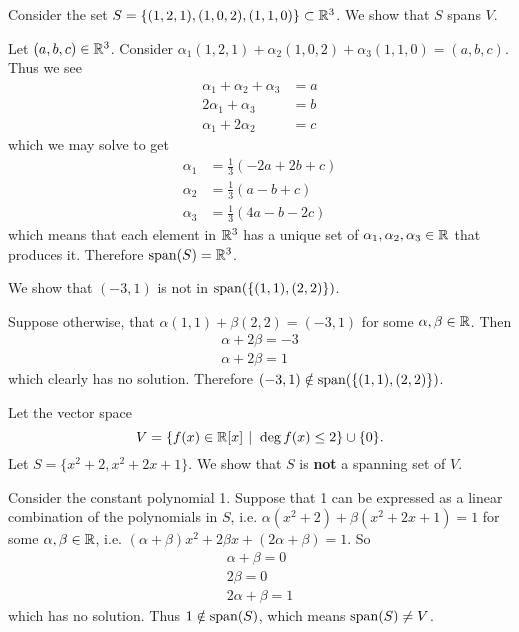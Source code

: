 \begin{example}
    Consider the set $S = \{(1, 2, 1), (1, 0, 2), (1, 1, 0)\} \subset \mathbb{R}^3$. We show that $S$ spans $V$.

    Let $(a, b, c) \in \mathbb{R}^3$. Consider $\alpha_1(1, 2, 1) + \alpha_2(1, 0, 2) + \alpha_3(1, 1, 0) = (a, b, c)$. Thus we see
    \begin{align*}
        \alpha_1 + \alpha_2 + \alpha_3 &= a\\
        2\alpha_1 + \alpha_3 &= b\\
        \alpha_1 + 2\alpha_2 &= c
    \end{align*}
    which we may solve to get
    \begin{align*}
        \alpha_1 &= \frac13(-2a + 2b + c)\\
        \alpha_2 &= \frac13(a - b + c)\\
        \alpha_3 &= \frac13(4a - b - 2c)
    \end{align*}
    which means that each element in $\mathbb{R}^3$ has a unique set of $\alpha_1, \alpha_2, \alpha_3 \in \mathbb{R}$ that produces it. Therefore $\mathrm{span}(S) = \mathbb{R}^3$.
\end{example}

\begin{example}
    We show that $(-3, 1)$ is not in $\mathrm{span}(\{(1,1), (2,2)\})$.

    Suppose otherwise, that $\alpha(1,1) + \beta(2,2) = (-3,1)$ for some $\alpha, \beta \in \mathbb{R}$. Then
    \begin{align*}
        \alpha + 2\beta = -3\\
        \alpha + 2\beta = 1
    \end{align*}
    which clearly has no solution. Therefore $(-3, 1) \notin \mathrm{span}(\{(1, 1), (2, 2)\})$.
\end{example}

\begin{example}
    Let the vector space
    \[
        V = \{f(x) \in \R[x] \vert \deg f(x) \leq 2\} \cup \{0\}.
    \]
    Let $S = \{x^2 + 2, x^2 + 2x + 1\}$. We show that $S$ is \textbf{not} a spanning set of $V$.

    Consider the constant polynomial 1. Suppose that 1 can be expressed as a linear combination of the polynomials in $S$, i.e. $\alpha(x^2 + 2) + \beta(x^2+2x+1) = 1$ for some $\alpha, \beta \in \mathbb{R}$, i.e. $(\alpha + \beta)x^2 + 2\beta x + (2\alpha + \beta) = 1$. So
    \begin{align*}
        \alpha + \beta = 0\\
        2\beta = 0\\
        2\alpha + \beta = 1
    \end{align*}
    which has no solution. Thus $1 \notin \mathrm{span}(S)$, which means $\mathrm{span}(S) \neq V$.
\end{example}

